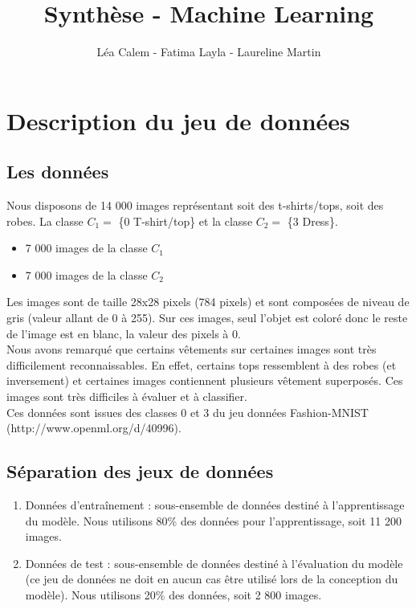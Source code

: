\documentclass[a4paper,10pt]{article}
\title{Synthèse - Machine Learning}
\author{Léa Calem - Fatima Layla - Laureline Martin}
\begin{document}
\maketitle
	
\section{Description du jeu de données}
	\subsection{Les données}
		Nous disposons de 14 000 images représentant soit des t-shirts/tops, soit des robes. La classe $C_1 =$ \{0 T-shirt/top\} et la classe $C_2 =$ \{3 Dress\}.
		\begin{itemize}
			\item 7 000 images de la classe $C_1$
			\item 7 000 images de la classe $C_2$
		\end{itemize}
		Les images sont de taille 28x28 pixels (784 pixels) et sont composées de niveau de gris (valeur allant de 0 à 255). Sur ces images, seul l’objet est coloré donc le reste de l’image est en blanc, la valeur des pixels à 0.\\
		Nous avons remarqué que certains vêtements sur certaines images sont très difficilement reconnaissables. En effet, certains tops ressemblent à des robes (et inversement) et certaines images contiennent plusieurs vêtement superposés. Ces images sont très difficiles à évaluer et à classifier.\\
		Ces données sont issues des classes 0 et 3 du jeu données Fashion-MNIST (http://www.openml.org/d/40996). 
	\subsection{Séparation des jeux de données}
		\begin{enumerate}
			\item Données d’entraînement : sous-ensemble de données destiné à l’apprentissage du modèle. Nous utilisons 80\% des données pour l'apprentissage, soit 11 200 images.
			\item Données de test : sous-ensemble de données destiné à l’évaluation du modèle (ce jeu de données ne doit en aucun cas être utilisé lors de la conception du modèle). Nous utilisons 20\% des données, soit 2 800 images.
		\end{enumerate}
\end{document}
